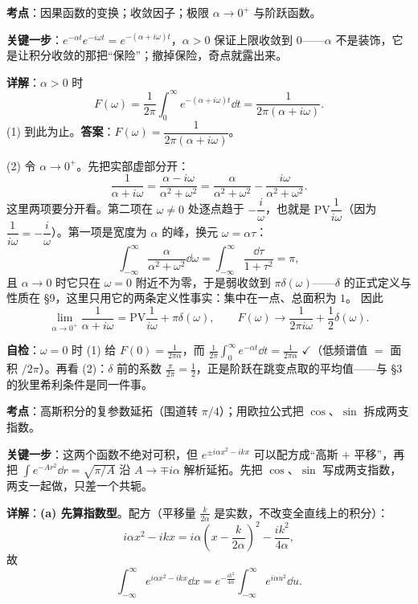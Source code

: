 \documentclass[11pt]{ctexart}
\begin{document}
\textbf{考点}：因果函数的变换；收敛因子；极限 $\alpha\to0^{+}$ 与阶跃函数。

\textbf{关键一步}：$e^{-\alpha t}e^{-i\omega t}=e^{-(\alpha+i\omega)t}$，$\alpha>0$ 保证上限收敛到 $0$——$\alpha$ 不是装饰，它是让积分收敛的那把“保险”；撤掉保险，奇点就露出来。

\textbf{详解}：$\alpha>0$ 时
\[ F(\omega)=\frac1{2\pi}\int_0^{\infty}e^{-(\alpha+i\omega)t}\dd t=\frac{1}{2\pi(\alpha+i\omega)} .\]
(1) 到此为止。\textbf{答案}：$F(\omega)=\dfrac{1}{2\pi(\alpha+i\omega)}$。

(2) 令 $\alpha\to0^{+}$。先把实部虚部分开：
\[ \frac{1}{\alpha+i\omega}=\frac{\alpha-i\omega}{\alpha^2+\omega^2}=\frac{\alpha}{\alpha^2+\omega^2}-\frac{i\omega}{\alpha^2+\omega^2} .\]
这里两项要分开看。第二项在 $\omega\neq0$ 处逐点趋于 $-\dfrac{i}{\omega}$，也就是 $\mathrm{PV}\dfrac{1}{i\omega}$（因为 $\dfrac{1}{i\omega}=-\dfrac{i}{\omega}$）。第一项是宽度为 $\alpha$ 的峰，换元 $\omega=\alpha\tau$：
\[ \int_{-\infty}^{\infty}\frac{\alpha}{\alpha^2+\omega^2}\dd\omega=\int_{-\infty}^{\infty}\frac{\dd\tau}{1+\tau^2}=\pi ,\]
且 $\alpha\to0$ 时它只在 $\omega=0$ 附近不为零，于是弱收敛到 $\pi\delta(\omega)$——$\delta$ 的正式定义与性质在 §9，这里只用它的两条定义性事实：集中在一点、总面积为 $1$。
因此
\[ \lim_{\alpha\to0^{+}}\frac{1}{\alpha+i\omega}=\mathrm{PV}\frac{1}{i\omega}+\pi\delta(\omega),\qquad
F(\omega)\longrightarrow\frac{1}{2\pi i\omega}+\frac12\delta(\omega) .\]

\textbf{自检}：$\omega=0$ 时 (1) 给 $F(0)=\frac{1}{2\pi\alpha}$，而 $\frac{1}{2\pi}\int_0^{\infty}e^{-\alpha t}\dd t=\frac{1}{2\pi\alpha}$ $\checkmark$（低频谱值 $=$ 面积 $/2\pi$）。再看 (2)：$\delta$ 前的系数 $\frac{\pi}{2\pi}=\frac12$，正是阶跃在跳变点取的平均值——与 §3 的狄里希利条件是同一件事。

\qbreak



\textbf{考点}：高斯积分的复参数延拓（围道转 $\pi/4$）；用欧拉公式把 $\cos$、$\sin$ 拆成两支指数。

\textbf{关键一步}：这两个函数不绝对可积，但 $e^{\pm i\alpha x^2-ikx}$ 可以配方成“高斯 $+$ 平移”，再把 $\int e^{-Ar^2}\dd r=\sqrt{\pi/A}$ 沿 $A\to\mp i\alpha$ 解析延拓。先把 $\cos$、$\sin$ 写成两支指数，两支一起做，只差一个共轭。

\textbf{详解}：\textbf{(a) 先算指数型}。配方（平移量 $\frac{k}{2\alpha}$ 是实数，不改变全直线上的积分）：
\[ i\alpha x^2-ikx=i\alpha\left(x-\frac{k}{2\alpha}\right)^2-\frac{ik^2}{4\alpha}, \]
故
\[ \int_{-\infty}^{\infty}e^{i\alpha x^2-ikx}\dd x=e^{-\frac{ik^2}{4\alpha}}\int_{-\infty}^{\infty}e^{i\alpha u^2}\dd u .\]
\end{document}
